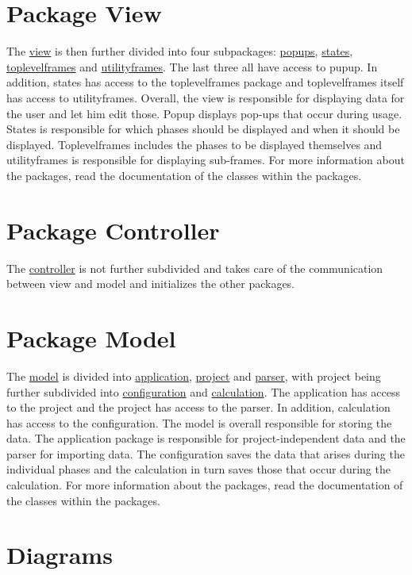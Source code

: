 \documentclass[letterpaper,10pt,english]{sphinxmanual}
\begin{document}
\section{Package View}
The \hyperlink{view}{view} is then further divided into four subpackages: \hyperlink{popups}{popups}, \hyperlink{states}{states}, \hyperlink{toplevelframes}{toplevelframes} and \hyperlink{utilityframes}{utilityframes}. The last three all have access to pupup. In addition, states has access to the toplevelframes package and toplevelframes itself has access to utilityframes. Overall, the view is responsible for displaying data for the user and let him edit those. Popup displays pop-ups that occur during usage. States is responsible for which phases should be displayed and when it should be displayed. Toplevelframes includes the phases to be displayed themselves and utilityframes is responsible for displaying sub-frames. For more information about the packages, read the documentation of the classes within the packages.

\section{Package Controller}
The \hyperlink{controller}{controller} is not further subdivided and takes care of the communication between view and model and initializes the other packages.

\section{Package Model}
The \hyperlink{model}{model} is divided into \hyperlink{application}{application}, \hyperlink{project}{project} and \hyperlink{parser}{parser}, with project being further subdivided into \hyperlink{configuration}{configuration} and \hyperlink{calculation}{calculation}. The application has access to the project and the project has access to the parser. In addition, calculation has access to the configuration. The model is overall responsible for storing the data. The application package is responsible for project-independent data and the parser for importing data. The configuration saves the data that arises during the individual phases and the calculation in turn saves those that occur during the calculation. For more information about the packages, read the documentation of the classes within the packages.

\section{Diagrams}
\end{document}
